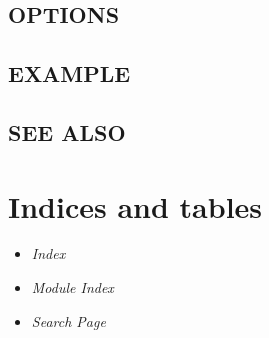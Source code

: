 \documentclass[letterpaper,10pt,english]{manual}
\begin{document}
\section{OPTIONS}


\section{EXAMPLE}


\section{SEE ALSO}


\chapter{Indices and tables}
\begin{itemize}
\item {} 
\emph{Index}

\item {} 
\emph{Module Index}

\item {} 
\emph{Search Page}

\end{itemize}


\renewcommand{\indexname}{Module Index}
\printmodindex
\renewcommand{\indexname}{Index}
\printindex
\end{document}

